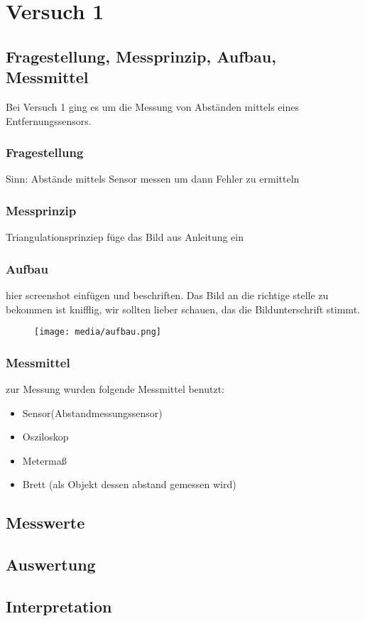 \chapter{Versuch 1}
\label{chap:VERSUCH_1}

\section{Fragestellung, Messprinzip, Aufbau, Messmittel}
\label{chap:VERSUCH_1_FRAGESTELLUNG}

Bei Versuch 1 ging es um die Messung von Abständen mittels eines Entfernungssensors.

\subsection*{Fragestellung}

	Sinn: Abstände mittels Sensor messen um dann Fehler zu ermitteln
\subsection*{Messprinzip}

	Triangulationsprinziep
	füge das Bild aus Anleitung ein
\subsection*{Aufbau}
	hier screenshot einfügen und beschriften. Das Bild an die richtige stelle zu bekommen ist knifflig, wir sollten lieber schauen, das die Bildunterschrift stimmt.
	\begin{figure}[h] %
		\texttt{[image: media/aufbau.png]}
		\label{Versuchsaufbau}
	\end{figure}

\subsection*{Messmittel}
	zur Messung wurden folgende Messmittel benutzt:
	\begin{itemize}
		\item Sensor(Abstandmessungssensor)
		\item Osziloskop
		\item Metermaß
		\item Brett (als Objekt dessen abstand gemessen wird)
	\end{itemize}


\section{Messwerte}
\label{chap:VERSUCH_1_MESSWERTE}

\section{Auswertung}
\label{chap:VERSUCH_1_AUSWERTUNG}


\section{Interpretation}
\label{chap:VERSUCH_1_INTERPRETATION}
